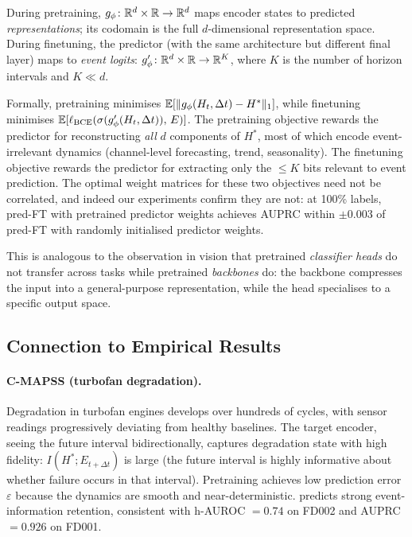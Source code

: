 During pretraining, $g_\phi \colon \mathbb{R}^d \times \mathbb{R} \to \mathbb{R}^d$ maps encoder states to predicted \emph{representations}; its codomain is the full $d$-dimensional representation space.
During finetuning, the predictor (with the same architecture but different final layer) maps to \emph{event logits}: $g_\phi' \colon \mathbb{R}^d \times \mathbb{R} \to \mathbb{R}^K$, where $K$ is the number of horizon intervals and $K \ll d$.

Formally, pretraining minimises $\mathbb{E}[\|g_\phi(H_t, \Delta t) - H^*\|_1]$, while finetuning minimises $\mathbb{E}[\ell_{\mathrm{BCE}}(\sigma(g_\phi'(H_t, \Delta t)),\, E)]$.
The pretraining objective rewards the predictor for reconstructing \emph{all} $d$ components of $H^*$, most of which encode event-irrelevant dynamics (channel-level forecasting, trend, seasonality).
The finetuning objective rewards the predictor for extracting only the $\leq K$ bits relevant to event prediction.
The optimal weight matrices for these two objectives need not be correlated, and indeed our experiments confirm they are not: at 100\% labels, pred-FT with pretrained predictor weights achieves AUPRC within $\pm 0.003$ of pred-FT with randomly initialised predictor weights.

This is analogous to the observation in vision that pretrained \emph{classifier heads} do not transfer across tasks while pretrained \emph{backbones} do: the backbone compresses the input into a general-purpose representation, while the head specialises to a specific output space.

\subsection{Connection to Empirical Results}

\paragraph{C-MAPSS (turbofan degradation).}
Degradation in turbofan engines develops over hundreds of cycles, with sensor readings progressively deviating from healthy baselines.
The target encoder, seeing the future interval bidirectionally, captures degradation state with high fidelity: $I(H^*; E_{t+\Delta t})$ is large (the future interval is highly informative about whether failure occurs in that interval).
Pretraining achieves low prediction error $\varepsilon$ because the dynamics are smooth and near-deterministic.
 predicts strong event-information retention, consistent with h-AUROC $= 0.74$ on FD002 and AUPRC $= 0.926$ on FD001.


